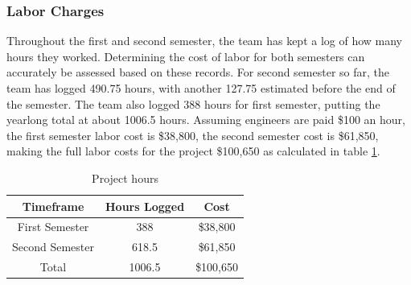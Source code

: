 \subsubsection{Labor Charges}
Throughout the first and second semester, the team has kept a log of how many hours they worked. Determining the cost of labor for both semesters can accurately be assessed based on these records. For second semester so far, the team has logged 490.75 hours, with another 127.75 estimated before the end of the semester. The team also logged 388 hours for first semester, putting the yearlong total at about 1006.5 hours. Assuming engineers are paid \$100 an hour, the first semester labor cost is \$38,800, the second semester cost is \$61,850, making the full labor costs for the project \$100,650 as calculated in table \ref{tab:projecthours}. 
\begin{table}[htbp]
  \centering
  \begin{tabular}{|c|c|c|}\hline
    \textbf{Timeframe} & \textbf{Hours Logged} & \textbf{Cost}\\\hline\hline
    First Semester     & 388                   & \$38,800\\\hline
    Second Semester    & 618.5                 & \$61,850\\\hline
    Total              & 1006.5                & \$100,650\\\hline
  \end{tabular}
  \caption{Project hours}
  \label{tab:projecthours}
\end{table}